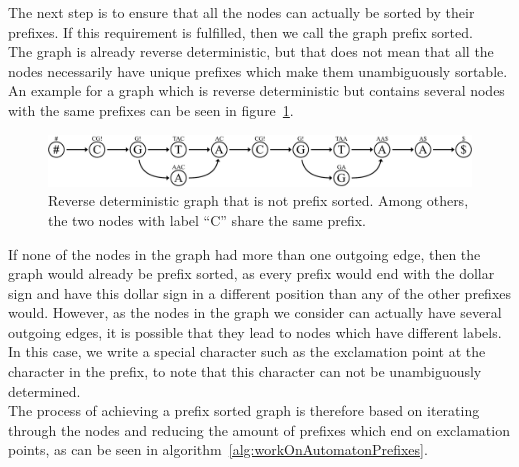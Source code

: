 \documentclass[a4paper,12pt,twoside,BCOR=10mm]{scrbook}
\begin{document}
The next step is to ensure that all the nodes can actually be sorted by their prefixes. 
If this requirement is fulfilled, then we call the graph prefix sorted. \\
The graph is already reverse deterministic, but that does not mean that all the nodes 
necessarily have unique prefixes which make them unambiguously sortable. 
An example for a graph which is reverse deterministic but contains several nodes 
with the same prefixes can be seen in figure~\ref{fig:evo_gml_rev_det_but_not_prev_sort}. 
\begin{figure}[!htb]
\centering
\includegraphics[width=\textwidth]{evo_gml_rev_det_but_not_prev_sort.pdf}
\caption[Reverse deterministic graph that is not prefix sorted]{Reverse deterministic graph that is not prefix sorted. Among others, the two nodes with label “C” share the same prefix.} \label{fig:evo_gml_rev_det_but_not_prev_sort}
\end{figure}
If none of the nodes in the graph had more than one outgoing edge, then the graph 
would already be prefix sorted, as every prefix would end with the dollar sign 
and have this dollar sign in a different position than any of the other prefixes would. 
However, as the nodes in the graph we consider can actually have several outgoing edges, 
it is possible that they lead to nodes which have different labels. In this case, 
we write a special character such as the exclamation point at the character in the prefix, 
to note that this character can not be unambiguously determined. \\
The process of achieving a prefix sorted graph is therefore based on iterating through 
the nodes and reducing the amount of 
prefixes which end on exclamation points, as can be seen in algorithm~\ref{alg:workOnAutomatonPrefixes}. 
\end{document}
